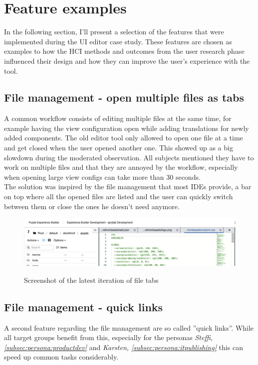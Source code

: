 \section{Feature examples}

In the following section, I'll present a selection of the features that were implemented during the UI editor case study.
These features are chosen as examples to how the HCI methods and outcomes from the user research phase influenced their design and how they can improve the user's experience with the tool. 

\subsection{File management - open multiple files as tabs}

A common workflow consists of editing multiple files at the same time, for example having the view configuration open while adding translations for newly added components.
The old editor tool only allowed to open one file at a time and get closed when the user opened another one. This showed up as a big slowdown during the moderated observation.
All subjects mentioned they have to work on multiple files and that they are annoyed by the workflow, especially when opening large view configs can take more than 30 seconds.
\\
The solution was inspired by the file management that most IDEs provide, a bar on top where all the opened files are listed and the user can quickly switch between them or close the ones he doesn't need anymore.

\begin{figure}[h]
  \includegraphics[width=\textwidth]{pics/file_tabs.png}
  \label{fig:file-tabs}
  \caption{Screenshot of the latest iteration of file tabs}
\end{figure}

\subsection{File management - quick links}

A second feature regarding the file management are so called ''quick links''. While all target groups benefit from this, especially for the personas \textit{Steffi, \ref{subsec:persona:productdev}} and \textit{Karsten, \ref{subsec:persona:itpublishing}}
this can speed up common tasks considerably.

